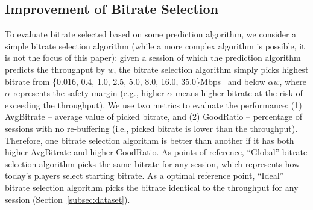 

\subsection{Improvement of Bitrate Selection}
\label{subsec:bitrate-eval}


 To evaluate bitrate selected based on some prediction algorithm, we consider a simple bitrate selection algorithm (while a more complex algorithm is possible, it is not the focus of this paper): given a session of which the prediction algorithm predicts the throughput by $w$, the bitrate selection algorithm simply picks highest bitrate from \{0.016, 0.4, 1.0, 2.5, 5.0, 8.0, 16.0, 35.0\}Mbps~\cite{youtube-bitrates} and below $\alpha w$, where $\alpha$ represents the safety margin (e.g.,  higher $\alpha$ means higher bitrate at the risk of exceeding the throughput). We use two metrics to evaluate the performance: (1) AvgBitrate -- average value of picked bitrate, and (2) GoodRatio -- percentage of sessions with no re-buffering (i.e., picked bitrate is lower than the throughput). Therefore, one bitrate selection algorithm is better than another if it has both higher AvgBitrate and higher GoodRatio.
As points of reference, ``Global'' bitrate selection algorithm picks the same bitrate for any session, which represents how today's players select starting bitrate. As a optimal reference point, ``Ideal'' bitrate selection algorithm picks the bitrate identical to the throughput for any session (Section~\ref{subsec:dataset}).

